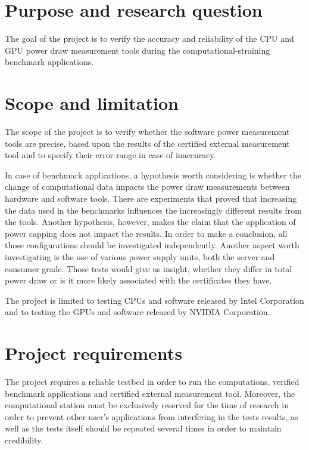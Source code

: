 \newpage


\section{Purpose and research question}

The goal of the project is to verify the accuracy and
reliability of the CPU and GPU power draw measurement
tools during the computational-straining benchmark applications.

\section{Scope and limitation}

The scope of the project is to verify whether the software
power measurement tools are precise, based upon the results
of the certified external measurement tool and to specify
their error range in case of inaccuracy.

In case of benchmark applications, a hypothesis worth
considering is whether the change of computational data
impacts the power draw measurements between hardware and
software tools. There are
experiments that proved that increasing
the data used in the benchmarks influences the increasingly
different results from the tools. Another hypothesis, however,
makes the claim that the application of power capping does
not impact the results. In order to make a conclusion, all
those configurations should be investigated independently.
Another aspect worth investigating is the use of various
power supply units, both the server and consumer grade. Those
tests would give us insight, whether they differ in total
power draw or is it more likely associated with the certificates
they have.

The project is limited to testing CPUs and software released
by Intel Corporation and to testing the GPUs and software
released by NVIDIA Corporation.

\section{Project requirements}

The project requires a reliable testbed in order to run the
computations, verified benchmark applications and certified
external measurement tool. Moreover, the computational station
must be exclusively reserved for the time of research in order
to prevent other user's applications from interfering in the
tests results, as well as the tests itself should be repeated
several times in order to maintain credibility.

